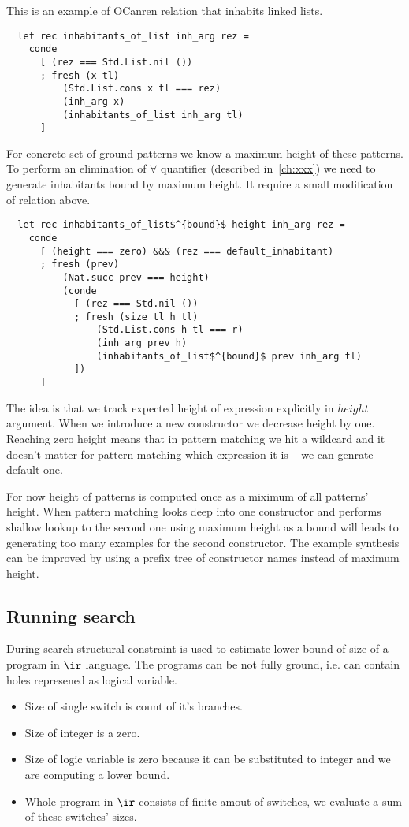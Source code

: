 This is an example of OCanren relation that inhabits linked lists.
\begin{lstlisting}
  let rec inhabitants_of_list inh_arg rez =
    conde
      [ (rez === Std.List.nil ())
      ; fresh (x tl)
          (Std.List.cons x tl === rez)
          (inh_arg x)
          (inhabitants_of_list inh_arg tl)
      ]
\end{lstlisting}

For concrete set of ground patterns we know a maximum height of these patterns. To perform an elimination of $\forall$ quantifier (described in~\ref{ch:xxx}) we need to generate inhabitants bound by maximum height. It require a small modification of relation above.

\begin{lstlisting}
  let rec inhabitants_of_list$^{bound}$ height inh_arg rez =
    conde
      [ (height === zero) &&& (rez === default_inhabitant)
      ; fresh (prev)
          (Nat.succ prev === height)
          (conde
            [ (rez === Std.nil ())
            ; fresh (size_tl h tl)
                (Std.List.cons h tl === r)
                (inh_arg prev h)
                (inhabitants_of_list$^{bound}$ prev inh_arg tl)
            ])
      ]
\end{lstlisting}

The idea is that we track expected height of expression explicitly in $height$ argument. When we introduce a new constructor we decrease height by one. Reaching zero height means that in pattern matching we hit a wildcard and it doesn't matter for pattern matching which expression it is -- we can genrate default one.

For now height of patterns is computed once as a miximum of all patterns' height. 
When pattern matching looks deep into one constructor and performs shallow lookup to the second one using maximum height as a bound will leads to generating too many examples for the second constructor. The example synthesis can be improved by using a prefix tree of constructor names instead of maximum height.

\subsection{Running search}
During search structural constraint is used to estimate lower bound of size of a program in $\ir$ language. The programs can be not fully ground, i.e. can contain holes represened as logical variable.
\begin{itemize}
\item Size of single switch is count of it's branches.
\item Size of integer is a zero.
\item Size of logic variable is zero because it can be substituted to integer and we are computing a lower bound.
\item Whole program in $\ir$ consists of finite amout of switches, we evaluate a sum of these switches' sizes.
\end{itemize}

